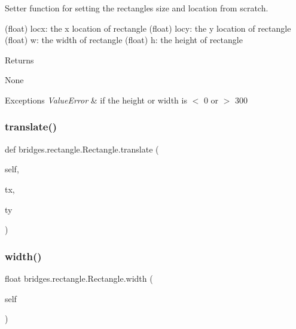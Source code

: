 Setter function for setting the rectangles size and location from scratch. 

\begin{DoxyVerb}       (float) locx: the x location of rectangle
       (float) locy: the y location of rectangle
       (float) w: the width of rectangle
       (float) h: the height of rectangle
\end{DoxyVerb}
 \begin{DoxyReturn}{Returns}


None
\end{DoxyReturn}

\begin{DoxyExceptions}{Exceptions}
{\em Value\+Error} & if the height or width is $<$ 0 or $>$ 300 \\
\hline
\end{DoxyExceptions}
\mbox{\label{classbridges_1_1rectangle_1_1_rectangle_aa032816d119516e90a4237cd979a5d41}} 
\subsubsection{\texorpdfstring{translate()}{translate()}}
{\footnotesize\ttfamily def bridges.\+rectangle.\+Rectangle.\+translate (\begin{DoxyParamCaption}\item[{}]{self,  }\item[{}]{tx,  }\item[{}]{ty }\end{DoxyParamCaption})}

\mbox{\label{classbridges_1_1rectangle_1_1_rectangle_a54dd44fc2660be14ae001536b2434898}} 
\subsubsection{\texorpdfstring{width()}{width()}\hspace{0.1cm}{\footnotesize\ttfamily [1/2]}}
{\footnotesize\ttfamily  float bridges.\+rectangle.\+Rectangle.\+width (\begin{DoxyParamCaption}\item[{}]{self }\end{DoxyParamCaption})}



